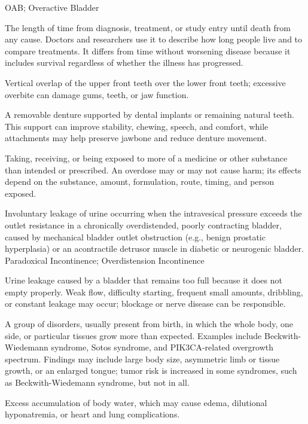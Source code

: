 \synonyms
OAB; Overactive Bladder

 The length of time from diagnosis, treatment, or study entry until death from any cause. Doctors and researchers use it to describe how long people live and to compare treatments. It differs from time without worsening disease because it includes survival regardless of whether the illness has progressed.

 Vertical overlap of the upper front teeth over the lower front teeth; excessive overbite can damage gums, teeth, or jaw function.

 A removable denture supported by dental implants or remaining natural teeth. This support can improve stability, chewing, speech, and comfort, while attachments may help preserve jawbone and reduce denture movement.

 Taking, receiving, or being exposed to more of a medicine or other substance than intended or prescribed. An overdose may or may not cause harm; its effects depend on the substance, amount, formulation, route, timing, and person exposed.

 Involuntary leakage of urine occurring when the intravesical pressure exceeds the outlet resistance in a chronically overdistended, poorly contracting bladder, caused by mechanical bladder outlet obstruction (e.g., benign prostatic hyperplasia) or an acontractile detrusor muscle in diabetic or neurogenic bladder.
\synonyms
Paradoxical Incontinence; Overdistension Incontinence

 Urine leakage caused by a bladder that remains too full because it does not empty properly. Weak flow, difficulty starting, frequent small amounts, dribbling, or constant leakage may occur; blockage or nerve disease can be responsible.

 A group of disorders, usually present from birth, in which the whole body, one side, or particular tissues grow more than expected. Examples include Beckwith-Wiedemann syndrome, Sotos syndrome, and PIK3CA-related overgrowth spectrum. Findings may include large body size, asymmetric limb or tissue growth, or an enlarged tongue; tumor risk is increased in some syndromes, such as Beckwith-Wiedemann syndrome, but not in all.

 Excess accumulation of body water, which may cause edema, dilutional hyponatremia, or heart and lung complications.

